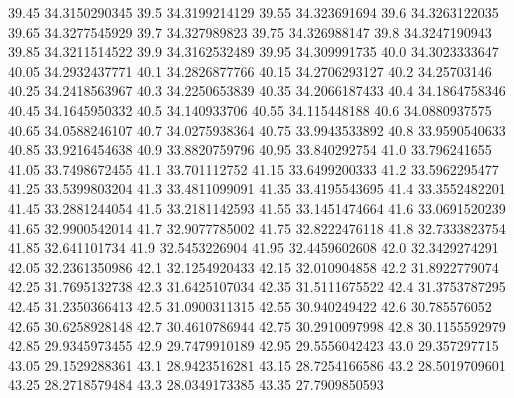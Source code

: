           39.45    34.3150290345
           39.5    34.3199214129
          39.55     34.323691694
           39.6    34.3263122035
          39.65    34.3277545929
           39.7     34.327989823
          39.75     34.326988147
           39.8    34.3247190943
          39.85    34.3211514522
           39.9    34.3162532489
          39.95     34.309991735
           40.0    34.3023333647
          40.05    34.2932437771
           40.1    34.2826877766
          40.15    34.2706293127
           40.2      34.25703146
          40.25    34.2418563967
           40.3    34.2250653839
          40.35    34.2066187433
           40.4    34.1864758346
          40.45    34.1645950332
           40.5     34.140933706
          40.55     34.115448188
           40.6    34.0880937575
          40.65    34.0588246107
           40.7    34.0275938364
          40.75    33.9943533892
           40.8    33.9590540633
          40.85    33.9216454638
           40.9    33.8820759796
          40.95     33.840292754
           41.0     33.796241655
          41.05    33.7498672455
           41.1     33.701112752
          41.15    33.6499200333
           41.2    33.5962295477
          41.25    33.5399803204
           41.3    33.4811099091
          41.35    33.4195543695
           41.4    33.3552482201
          41.45    33.2881244054
           41.5    33.2181142593
          41.55    33.1451474664
           41.6    33.0691520239
          41.65    32.9900542014
           41.7    32.9077785002
          41.75    32.8222476118
           41.8    32.7333823754
          41.85     32.641101734
           41.9    32.5453226904
          41.95    32.4459602608
           42.0    32.3429274291
          42.05    32.2361350986
           42.1    32.1254920433
          42.15     32.010904858
           42.2    31.8922779074
          42.25    31.7695132738
           42.3    31.6425107034
          42.35    31.5111675522
           42.4    31.3753787295
          42.45    31.2350366413
           42.5    31.0900311315
          42.55     30.940249422
           42.6     30.785576052
          42.65    30.6258928148
           42.7    30.4610786944
          42.75    30.2910097998
           42.8    30.1155592979
          42.85    29.9345973455
           42.9    29.7479910189
          42.95    29.5556042423
           43.0     29.357297715
          43.05    29.1529288361
           43.1    28.9423516281
          43.15    28.7254166586
           43.2    28.5019709601
          43.25    28.2718579484
           43.3    28.0349173385
          43.35    27.7909850593
